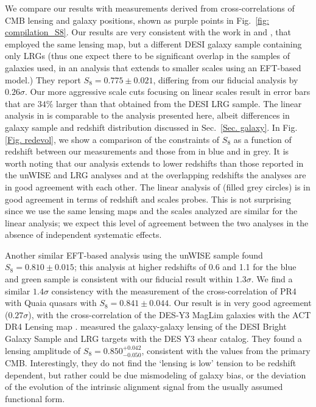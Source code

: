 \documentclass[twocolumn]{aastex631}
\begin{document}
{We compare our results with measurements derived from cross-correlations of CMB lensing and galaxy positions, shown as purple points in Fig.~\ref{fig: compilation_S8}. Our results are very consistent with the work in \cite{Kim2024} and  \cite{Sailer2024}, that employed the same lensing map, but a different DESI galaxy sample containing only LRGs (thus one expect there to be significant overlap in the samples of galaxies used, in an analysis that extends to smaller scales using an EFT-based model.) They report  $S_8=0.775\pm0.021$, differing from our fiducial analysis by $0.26\sigma$. Our more aggressive scale cuts focusing on linear scales result in error bars that are $34\%$ larger than that obtained from the DESI LRG sample. The linear analysis in \cite{Sailer2024,Kim2024} is comparable to the analysis presented here, albeit differences in galaxy sample and redshift distribution discussed in Sec.~\ref{Sec. galaxy}.    In Fig. \ref{Fig. redevol}, we show a comparison of the constraints of $S_8$ as a function of redshift between our measurements and those from \cite{farren2023atacama} in blue and \cite{Sailer2024,Kim2024} in grey. It is worth noting that our analysis extends to lower redshifts than those reported in the unWISE and LRG analyses and at the overlapping redshifts the analyses are in good agreement with each other.  The linear analysis of \cite{Sailer2024,Kim2024} (filled grey circles) is in good agreement in terms of redshift and scales probes. This is not surprising since  we use the same lensing maps and the scales analyzed are similar for the linear analysis; we expect this level of agreement between the two analyses in the absence of independent systematic effects.


Another similar EFT-based analysis using the unWISE sample found $S_8=0.810\pm0.015$; this analysis at higher redshifts of 0.6 and 1.1 for the blue and green sample is consistent with our fiducial result within $1.3\sigma$. 
We find a similar $1.4\sigma$ consistency with the measurement of the cross-correlation of PR4 with Quaia quasars \citep{piccirilli2024growth} with $S_8=0.841\pm0.044$. Our result is in very good agreement ($0.27\sigma$), with the cross-correlation of the DES-Y3 MagLim galaxies with the ACT DR4 Lensing map \citep{2024JCAP...01..033M}. \cite{2024arXiv240704795C} measured the galaxy-galaxy lensing of the DESI Bright Galaxy Sample \citep[BGS; ][]{Hahn_2023} and LRG targets with the DES Y3 shear catalog. They found a lensing amplitude of $S_8=0.850^{+0.042}_{-0.050}$, consistent with the values from the primary CMB. Interestingly, they do not find the `lensing is low' tension to be redshift dependent, but rather could be due mismodeling of galaxy bias, or the deviation of the evolution of the intrinsic alignment signal from the usually assumed functional form.

}
\end{document}

